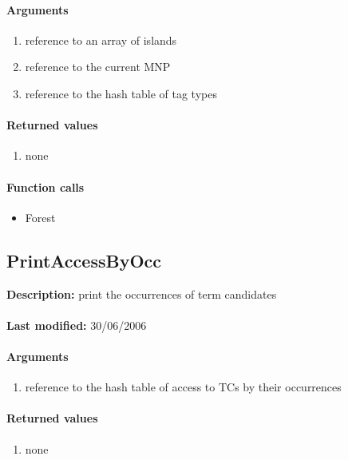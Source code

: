 \paragraph{Arguments}
\begin{enumerate}
\item reference to an array of islands
\item reference to the current MNP
\item reference to the hash table of tag types
\end{enumerate}

\paragraph{Returned values}
\begin{enumerate}
\item none
\end{enumerate}

\paragraph{Function calls}
\begin{itemize}
\item Forest
\end{itemize}

\subsection{PrintAccessByOcc}
\textbf{Description:} print the occurrences of term candidates\\
\\\textbf{Last modified:} 30/06/2006

\paragraph{Arguments}
\begin{enumerate}
\item reference to the hash table of access to TCs by their occurrences
\end{enumerate}

\paragraph{Returned values}
\begin{enumerate}
\item none
\end{enumerate}

